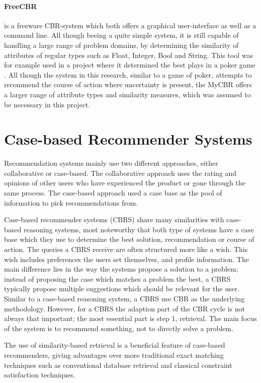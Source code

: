 \paragraph{FreeCBR}
is a freeware CBR-system which both offers a graphical user-interface as well as a command line. All though beeing a quite simple system, it is still capable of handling a large range of problem domains, by determining the similarity of attributes of regular types such as Float, Integer, Bool and String. This tool was for example used in a project where it determined the best plays in a poker game \cite{sandven2006case}. All though the system in this research, similar to a game of poker, attempts to recommend the course of action where uncertainty is present, the MyCBR offers a larger range of attribute types and similarity measures, which was assumed to be necessary in this project.


\section{Case-based Recommender Systems}\label{sec:case_based_recommender_systems}
Recommendation systems mainly use two different approaches, either collaborative or case-based. The collaborative approach uses the rating and opinions of other users who have experienced the product or gone through the same process. The case-based approach used a case base as the pool of information to pick recommendations from.

Case-based recommender systems (CBRS) share many similarities with case-based reasoning systems, most noteworthy that both type of systems have a case base which they use to determine the best solution, recommendation or course of action. The queries a CBRS receive are often structured more like a wish.\cite{richter2013case} This wish includes preferences the users set themselves, and profile information. The main difference lies in the way the systems propose a solution to a problem; instead of proposing the case which matches a problem the best, a CBRS typically propose multiple suggestions which should be relevant for the user. Similar to a case-based reasoning system, a CBRS use CBR as the underlying methodology. However, for a CBRS the adaption part of the CBR cycle is not always that important; the most essential part is step 1, retrieval. The main focus of the system is to recommend something, not to directly solve a problem. 

The use of similarity-based retrieval is a beneficial feature of case-based recommenders, giving advantages over more traditional exact matching techniques such as conventional database retrieval and classical constraint satisfaction techniques\cite{bridge2005case}.

